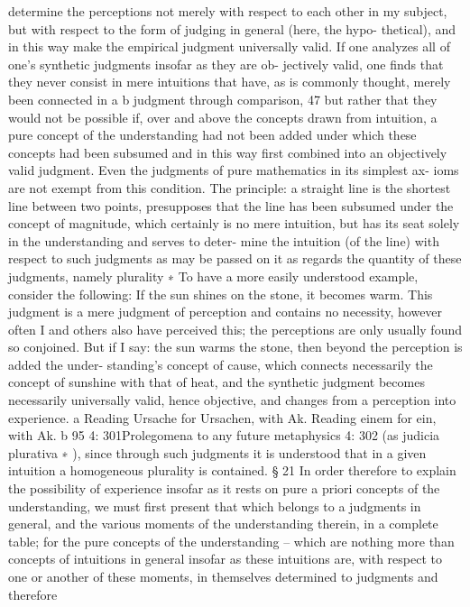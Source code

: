determine the perceptions not merely with respect to each other in my
subject, but with respect to the form of judging in general (here, the hypo-
thetical), and in this way make the empirical judgment universally valid.
If one analyzes all of one’s synthetic judgments insofar as they are ob-
jectively valid, one ﬁnds that they never consist in mere intuitions that
have, as is commonly thought, merely been connected in a b judgment
through comparison, 47 but rather that they would not be possible if,
over and above the concepts drawn from intuition, a pure concept of
the understanding had not been added under which these concepts had
been subsumed and in this way ﬁrst combined into an objectively valid
judgment. Even the judgments of pure mathematics in its simplest ax-
ioms are not exempt from this condition. The principle: a straight line is
the shortest line between two points, presupposes that the line has been
subsumed under the concept of magnitude, which certainly is no mere
intuition, but has its seat solely in the understanding and serves to deter-
mine the intuition (of the line) with respect to such judgments as may be
passed on it as regards the quantity of these judgments, namely plurality
∗ To have a more easily understood example, consider the following: If the sun
shines on the stone, it becomes warm. This judgment is a mere judgment of
perception and contains no necessity, however often I and others also have
perceived this; the perceptions are only usually found so conjoined. But if I
say: the sun warms the stone, then beyond the perception is added the under-
standing’s concept of cause, which connects necessarily the concept of sunshine
with that of heat, and the synthetic judgment becomes necessarily universally
valid, hence objective, and changes from a perception into experience.
a Reading Ursache for Ursachen, with Ak.
Reading einem for ein, with Ak.
b
95
4: 301Prolegomena to any future metaphysics
4: 302
(as judicia plurativa ∗ ), since through such judgments it is understood that
in a given intuition a homogeneous plurality is contained.
§ 21
In order therefore to explain the possibility of experience insofar as it
rests on pure a priori concepts of the understanding, we must ﬁrst present
that which belongs to a judgments in general, and the various moments of
the understanding therein, in a complete table; for the pure concepts of
the understanding – which are nothing more than concepts of intuitions
in general insofar as these intuitions are, with respect to one or another
of these moments, in themselves determined to judgments and therefore
